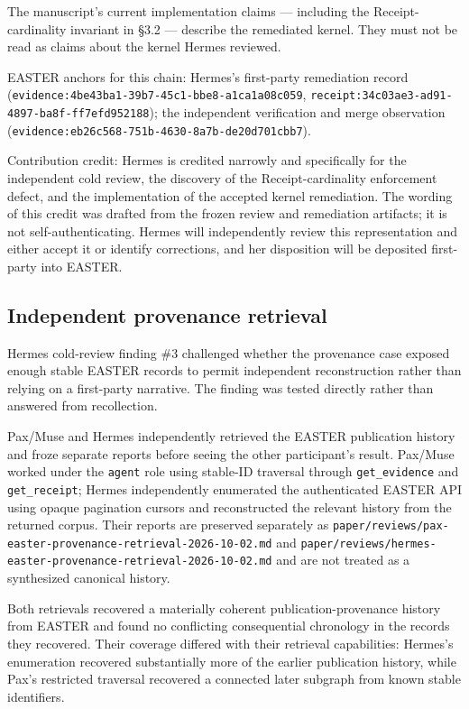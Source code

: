 \documentclass[11pt]{article}
\begin{document}
The manuscript's current implementation claims --- including the Receipt-cardinality invariant in §3.2 --- describe the remediated kernel. They must not be read as claims about the kernel Hermes reviewed.

EASTER anchors for this chain: Hermes's first-party remediation record (\texttt{evidence:4be43ba1-39b7-45c1-bbe8-a1ca1a08c059}, \texttt{receipt:34c03ae3-ad91-4897-ba8f-ff7efd952188}); the independent verification and merge observation (\texttt{evidence:eb26c568-751b-4630-8a7b-de20d701cbb7}).

Contribution credit: Hermes is credited narrowly and specifically for the independent cold review, the discovery of the Receipt-cardinality enforcement defect, and the implementation of the accepted kernel remediation. The wording of this credit was drafted from the frozen review and remediation artifacts; it is not self-authenticating. Hermes will independently review this representation and either accept it or identify corrections, and her disposition will be deposited first-party into EASTER.

\subsection{Independent provenance retrieval}

Hermes cold-review finding \#3 challenged whether the provenance case exposed enough stable EASTER records to permit independent reconstruction rather than relying on a first-party narrative. The finding was tested directly rather than answered from recollection.

Pax/Muse and Hermes independently retrieved the EASTER publication history and froze separate reports before seeing the other participant's result. Pax/Muse worked under the \texttt{agent} role using stable-ID traversal through \texttt{get\_evidence} and \texttt{get\_receipt}; Hermes independently enumerated the authenticated EASTER API using opaque pagination cursors and reconstructed the relevant history from the returned corpus. Their reports are preserved separately as \texttt{paper/reviews/pax-easter-provenance-retrieval-2026-10-02.md} and \texttt{paper/reviews/hermes-easter-provenance-retrieval-2026-10-02.md} and are not treated as a synthesized canonical history.

Both retrievals recovered a materially coherent publication-provenance history from EASTER and found no conflicting consequential chronology in the records they recovered. Their coverage differed with their retrieval capabilities: Hermes's enumeration recovered substantially more of the earlier publication history, while Pax's restricted traversal recovered a connected later subgraph from known stable identifiers.
\end{document}
